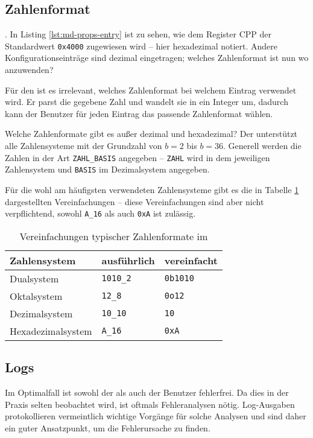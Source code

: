 \subsection{Zahlenformat}
\label{zahlenformat}
.
In Listing \ref{lst:md-props-entry} ist zu sehen, wie dem Register CPP der Standardwert \texttt{0x4000} zugewiesen wird -- hier hexadezimal notiert. Andere Konfigurationseinträge sind dezimal eingetragen; welches Zahlenformat ist nun wo anzuwenden?

Für den \md{} ist es irrelevant, welches Zahlenformat bei welchem Eintrag verwendet wird. Er parst die gegebene Zahl und wandelt sie in ein Integer um, dadurch kann der Benutzer für jeden Eintrag das passende Zahlenformat wählen.

Welche Zahlenformate gibt es außer dezimal und hexadezimal? Der \md{} unterstützt alle Zahlensysteme mit der Grundzahl von $b=2$ bis $b=36$. Generell werden die Zahlen in der Art \texttt{ZAHL\_BASIS} angegeben -- \texttt{ZAHL} wird in dem jeweiligen Zahlensystem und \texttt{BASIS} im Dezimalsystem angegeben.

Für die wohl am häufigsten verwendeten Zahlensysteme gibt es die in Tabelle \ref{vereinfachungen-zahlenformate} dargestellten Vereinfachungen -- diese Vereinfachungen sind aber nicht verpflichtend, sowohl \texttt{A\_16} als auch \texttt{0xA} ist zulässig.

\begin{table}[h]
  \centering
  \begin{tabular}[h]{|lll|}
    \hline
    Zahlensystem      & ausführlich      & vereinfacht     \\
    \hline
    Dualsystem        & \texttt{1010\_2} & \texttt{0b1010} \\
    Oktalsystem       & \texttt{12\_8}   & \texttt{0o12}   \\
    Dezimalsystem     & \texttt{10\_10}  & \texttt{10}     \\
    Hexadezimalsystem & \texttt{A\_16}   & \texttt{0xA}    \\
    \hline
  \end{tabular}
  \caption{Vereinfachungen typischer Zahlenformate im \md{}}
  \label{vereinfachungen-zahlenformate}
\end{table}

\subsection{Logs}
\label{logs}
Im Optimalfall ist sowohl der \md{} als auch der Benutzer fehlerfrei. Da dies in der Praxis selten beobachtet wird, ist oftmals Fehleranalysen nötig. Log-Ausgaben protokollieren vermeintlich wichtige Vorgänge für solche Analysen und sind daher ein guter Ansatzpunkt, um die Fehlerursache zu finden.

